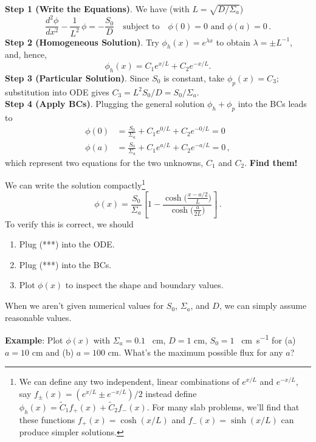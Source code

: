 \documentclass[compact]{ne630handout}
\begin{document}
\begin{handoutflow}
\textbf{Step 1 (Write the Equations)}. We have (with $L=\sqrt{D/\Sigma_a}$)
\begin{equation*}
\tag{ODE and BCs}
 \frac{d^2\phi}{dx^2} - \frac{1}{L^2}\,\phi = -\frac{S_0}{D}  \quad \text{subject to} \quad  \phi(0) = 0  \,\, \text{and} \,\, \phi(a) = 0 \, .
\end{equation*}
\textbf{Step 2 (Homogeneous Solution)}. Try $\phi_h(x)=e^{\lambda x}$ to obtain $\lambda=\pm L^{-1}$, and, hence,
\begin{equation*}
 \phi_h(x)=C_1 e^{x/L}+C_2 e^{-x/L}.
\end{equation*}
\textbf{Step 3 (Particular Solution)}. Since $S_0$ is constant, take $\phi_p(x)=C_3$; substitution into ODE gives $C_3=L^2 S_0 /D = S_0/\Sigma_a$.\\[4pt]
\textbf{Step 4 (Apply BCs)}. Plugging the general solution $\phi_h+\phi_p$ into the BCs leads to
\begin{align*}
\tag{left BC}
 \phi(0) &=\frac{S_0}{\Sigma_a}+C_1 e^{0/L}+C_2 e^{-0/L} = 0\\
\tag{right BC}
 \phi(a) &=\frac{S_0}{\Sigma_a}+C_1 e^{a/L}+C_2 e^{-a/L} = 0 \, ,
\end{align*}
which represent two equations for the two unknowns, $C_1$ and $C_2$.  {\bf Find them!}

We can write the solution compactly\footnote{We can define any two independent, linear combinations
of $e^{x/L}$ and $e^{-x/L}$, say $f_{\pm}(x) =  (e^{x/L} \pm e^{-x/L})/2$
instead define $\phi_h(x) = \tilde{C}_1 f_+(x) + \tilde{C}_2 f_-(x)$.  For many slab problems,
we'll find that these functions $f_+(x) = \cosh(x/L)$ and $f_-(x) =\sinh(x/L)$ can produce
simpler solutions.
}
\begin{equation*}
 \tag{***}
 \phi(x)=\frac{S_0}{\Sigma_a}\left[1-\frac{\cosh\!\big(\tfrac{x-a/2}{L}\big)}{\cosh\!\big(\tfrac{a}{2L}\big)}\right] \, .
 \label{eq:ex1sol}
\end{equation*}
To verify this is correct, we should
\begin{enumerate}
 \item Plug (***) into the ODE.
 \item Plug (***) into the BCs.
 \item Plot $\phi(x)$ to inspect the shape and boundary values.
\end{enumerate}
When we aren't given numerical values for $S_0$, $\Sigma_a$, and $D$, we can simply assume reasonable values.

{\bf Example}: Plot $\phi(x)$ with $\Sigma_a=0.1$ \si{\per\centi\meter}, $D=1$ \si{\centi\meter}, $S_0=1$ \si{\per\centi\meter\per\second} for (a) $a=10$ \si{\centi\meter} and (b) $a=100$ \si{\centi\meter}.  What's the maximum possible flux for any $a$?

\end{handoutflow}
\end{document}
